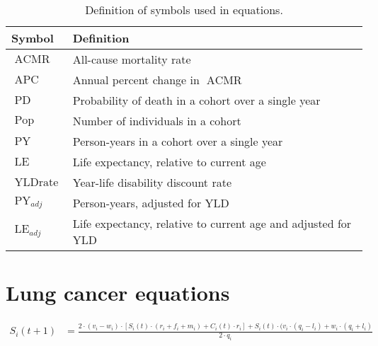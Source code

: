 \documentclass[12pt]{scrartcl}
\DeclareMathOperator{\APC}{APC}
\DeclareMathOperator{\ACMR}{ACMR}
\DeclareMathOperator{\PD}{PD}
\DeclareMathOperator{\PY}{PY}
\DeclareMathOperator{\LE}{LE}
\DeclareMathOperator{\Pop}{Pop}
\DeclareMathOperator{\YLDrate}{YLDrate}
\begin{document}
\begin{table}
  \centering
  \begin{tabular}{ll}
    \toprule
    Symbol & Definition \\
    \midrule
    \(\ACMR\) & All-cause mortality rate \\
    \(\APC\) & Annual percent change in \(\ACMR\) \\
    \(\PD\) & Probability of death in a cohort over a single year \\
    \(\Pop\) & Number of individuals in a cohort \\
    \(\PY\) & Person-years in a cohort over a single year \\
    \(\LE\) & Life expectancy, relative to current age \\
    \(\YLDrate\) & Year-life disability discount rate \\
    \(\PY_{adj}\) & Person-years, adjusted for YLD \\
    \(\LE_{adj}\) & Life expectancy, relative to current age and adjusted for YLD \\
    \bottomrule
  \end{tabular}
  \caption{Definition of symbols used in equations.}
  \label{tbl:defns}
\end{table}

\section*{Lung cancer equations}

\begin{align*}
  S_i(t+1) &= \frac{2 \cdot (v_i - w_i) \cdot%
    \left[ S_i(t) \cdot(r_i + f_i + m_i) + C_i(t) \cdot r_i \right]%
    + S_i(t) \cdot (v_i \cdot (q_i - l_i) + w_i \cdot (q_i + l_i)%
  }{2 \cdot q_i}
\end{align*}
\end{document}
